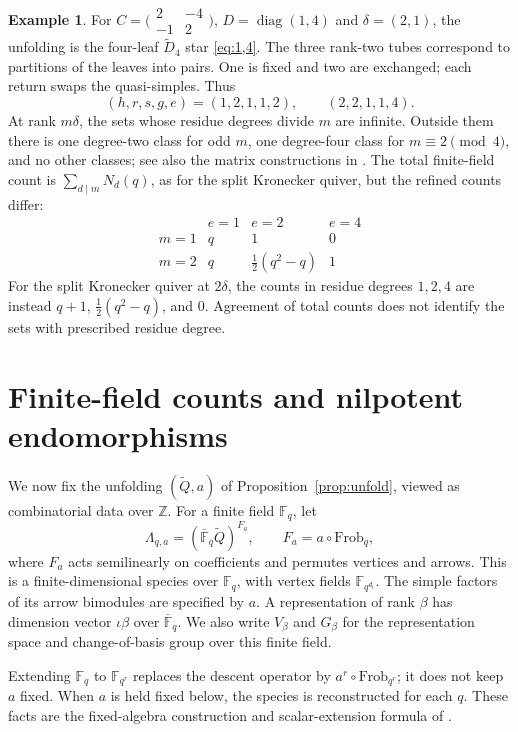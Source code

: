 \documentclass[11pt, reqno]{amsart}
\numberwithin{equation}{section}
\theoremstyle{definition}
\newtheorem{example}[theorem]{Example}
\theoremstyle{remark}
\newcommand{\op}[1]{\operatorname{#1}}
\newcommand{\mr}[1]{\mathrm{#1}}
\newcommand{\mb}[1]{\mathbb{#1}}
\newcommand{\Qbar}{\widetilde Q}
\begin{document}
\begin{example}\label{ex:14-affine}
For $C=\bigl(\begin{smallmatrix}2&-4\\-1&2\end{smallmatrix}\bigr)$,
$D=\op{diag}(1,4)$ and $\delta=(2,1)$, the unfolding is the
four-leaf $\widetilde D_4$ star \eqref{eq:1,4}.
The three rank-two tubes correspond to partitions of the leaves into
pairs. One is fixed and two are exchanged; each return swaps the
quasi-simples. Thus
\[ (h,r,s,g,e)=(1,2,1,1,2),\qquad(2,2,1,1,4). \]
At rank $m\delta$, the sets whose residue degrees divide $m$ are
infinite. Outside them there
is one degree-two class for odd $m$, one degree-four class for
$m\equiv2\pmod4$, and no other classes; see also the matrix
constructions in \cite{GR,GRR}.
The total finite-field count is $\sum_{d\mid m}N_d(q)$, as for the
split Kronecker quiver, but the refined counts differ:
\[
\begin{array}{c|ccc}
 &e=1&e=2&e=4\\\hline
 m=1&q&1&0\\
 m=2&q&\tfrac12(q^2-q)&1
\end{array}
\]
For the split Kronecker quiver at $2\delta$, the counts in residue
degrees $1,2,4$ are instead $q+1$, $\tfrac12(q^2-q)$, and $0$. Agreement of total counts does not
identify the sets with prescribed residue degree.
\end{example}

\section{Finite-field counts and nilpotent endomorphisms}
\label{sec:count}

We now fix the unfolding $(\Qbar,a)$ of
Proposition~\ref{prop:unfold}, viewed as combinatorial data over
$\mb Z$. For a finite field $\mb F_q$, let
\[ \Lambda_{q,a}=(\overline{\mb F}_q\Qbar)^{F_a},\qquad F_a=a\circ\mr{Frob}_q, \]
where $F_a$ acts semilinearly on coefficients and permutes vertices and
arrows. This is a finite-dimensional species over $\mb F_q$,
with vertex fields $\mb F_{q^{d_i}}$. The simple factors of its
arrow bimodules are specified by $a$. A representation of rank
$\beta$ has dimension vector $\iota\beta$ over
$\overline{\mb F}_q$. We also write $V_\beta$ and $G_\beta$
for the representation space and change-of-basis group over this
finite field.

Extending $\mb F_q$ to $\mb F_{q^r}$ replaces the descent
operator by $a^r\circ\mr{Frob}_{q^r}$; it does not keep $a$ fixed.
When $a$ is held fixed below, the species is reconstructed for each $q$.
These facts are the fixed-algebra construction and scalar-extension
formula of \cite[Proposition~6.3 and Corollary~6.4]{DengDu}.
\end{document}
